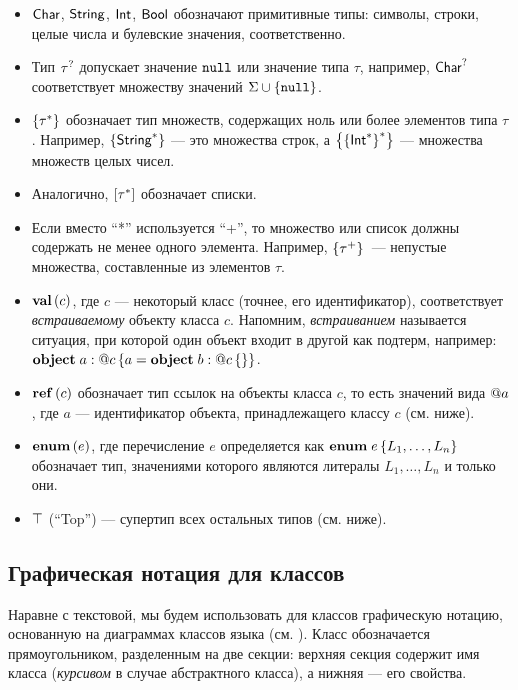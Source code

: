 \begin{itemize}
\item $\mathsf{Char}$, $\mathsf{String}$, $\mathsf{Int}$, $\mathsf{Bool}$ обозначают примитивные типы: символы, строки, целые числа и булевские значения, соответственно.
\item Тип ${\tau}^?$ допускает значение $\mathtt{null}$ или значение типа $\tau$, например, ${\mathsf{Char}}^?$ соответствует множеству значений $\Sigma \cup \{\mathtt{null}\}$.
\item $\left\{\tau^*\right\}$ обозначает тип множеств, содержащих ноль или более элементов типа $\tau$. Например, $\left\{\mathsf{String}^*\right\}$ --- 
это множества строк, а $\left\{\left\{\mathsf{Int}^*\right\}^*\right\}$ --- множества множеств целых чисел. 
\item Аналогично, $\left[\tau^*\right]$ обозначает списки. 
\item Если вместо ``*'' используется ``+'', то множество или список должны содержать не менее одного элемента. Например, $\left\{\tau^+\right\}$~--- непустые множества, составленные из элементов $\tau$. 
\item $\mathbf{val}\left(c\right)$, где $c$ --- некоторый класс (точнее, его идентификатор), соответствует \emph{встраиваемому} объекту класса $c$. Напомним, \emph{встраиванием} называется ситуация, при которой один объект входит в другой как подтерм, например: $\mathbf{object}\;a : @c\left\{ a = \mathbf{object}\;b : @c\left\{  \right\} \right\}$.
\item $\mathbf{ref}\left(c\right)$ обозначает тип ссылок на объекты класса $c$, то есть значений вида $@a$, где $a$ --- идентификатор объекта, принадлежащего классу $c$ (см. ниже).
\item $\mathbf{enum}\left(e\right)$, где перечисление $e$ определяется как $\mathbf{enum}\;e\left\{L_1,\ldots,L_n\right\}$ обозначает тип, значениями которого являются литералы $L_1,\ldots,L_n$ и только они.
\item $\top$ (``Top'') --- супертип всех остальных типов (см. ниже).
\end{itemize}

\subsection{Графическая нотация для классов}

Наравне с текстовой, мы будем использовать для классов графическую нотацию, основанную на диаграммах классов языка  (см. ). Класс обозначается прямоугольником, разделенным на две секции: верхняя секция содержит имя класса (\emph{курсивом} в случае абстрактного класса), а нижняя --- его свойства.

